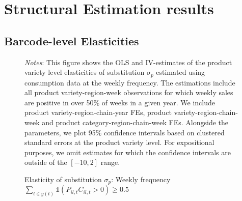 \section{Structural Estimation results}
\subsection{Barcode-level Elasticities}

\begin{figure}[H]
    \centering
    \caption{Elasticity of substitution $\sigma_p$: Weekly frequency $\sum_{t \in y(t)} \mathbb{1}(P_{il,t}C_{il,t} > 0) \geq 0.5$}
    \label{fig: app_elas_sigma_cats_weekly_50ptt}
    
     \parbox{\textwidth}{
        \begin{spacing}{1} 
            {\footnotesize 
            \textit{Notes}: This figure shows the OLS and IV-estimates of the product variety level elasticities of substitution $\sigma_p$ estimated using consumption data at the weekly frequency. The estimations include all product variety-region-week observations for which weekly sales are positive in over 50\% of weeks in a given year. We include product variety-region-chain-year FEs, product variety-region-chain-week and product category-region-chain-week FEs. Alongside the parameters, we plot 95\% confidence intervals based on clustered standard errors at the product variety level. For expositional purposes, we omit estimates for which the confidence intervals are outside of the $[-10,2]$ range.}
        \end{spacing}}
 \end{figure} 

